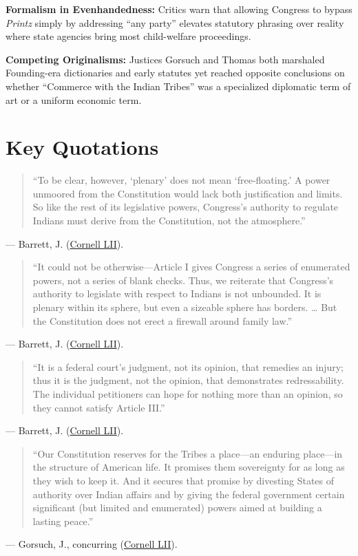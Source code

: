 \documentclass[12pt]{article}
\begin{document}
\textbf{Formalism in Evenhandedness:} Critics warn that allowing Congress to bypass \textit{Printz} simply by addressing ``any party'' elevates statutory phrasing over reality where state agencies bring most child-welfare proceedings.

\textbf{Competing Originalisms:} Justices Gorsuch and Thomas both marshaled Founding-era dictionaries and early statutes yet reached opposite conclusions on whether ``Commerce with the Indian Tribes'' was a specialized diplomatic term of art or a uniform economic term.

\section{Key Quotations}
\begin{quote}
``To be clear, however, `plenary' does not mean `free-floating.' A power unmoored from the Constitution would lack both justification and limits. So like the rest of its legislative powers, Congress's authority to regulate Indians must derive from the Constitution, not the atmosphere.''
\end{quote}
\noindent --- Barrett, J. (\href{https://www.law.cornell.edu/supremecourt/text/21-376}{Cornell LII}).

\begin{quote}
``It could not be otherwise---Article I gives Congress a series of enumerated powers, not a series of blank checks. Thus, we reiterate that Congress's authority to legislate with respect to Indians is not unbounded. It is plenary within its sphere, but even a sizeable sphere has borders. \ldots{} But the Constitution does not erect a firewall around family law.''
\end{quote}
\noindent --- Barrett, J. (\href{https://www.law.cornell.edu/supremecourt/text/21-376}{Cornell LII}).

\begin{quote}
``It is a federal court's judgment, not its opinion, that remedies an injury; thus it is the judgment, not the opinion, that demonstrates redressability. The individual petitioners can hope for nothing more than an opinion, so they cannot satisfy Article III.''
\end{quote}
\noindent --- Barrett, J. (\href{https://www.law.cornell.edu/supremecourt/text/21-376}{Cornell LII}).

\begin{quote}
``Our Constitution reserves for the Tribes a place---an enduring place---in the structure of American life. It promises them sovereignty for as long as they wish to keep it. And it secures that promise by divesting States of authority over Indian affairs and by giving the federal government certain significant (but limited and enumerated) powers aimed at building a lasting peace.''
\end{quote}
\noindent --- Gorsuch, J., concurring (\href{https://www.law.cornell.edu/supremecourt/text/21-376}{Cornell LII}).
\end{document}
